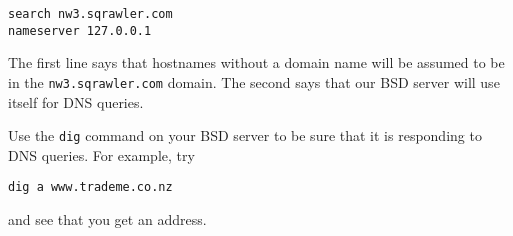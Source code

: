 \documentclass{article}
\begin{document}
\begin{verbatim}
search nw3.sqrawler.com
nameserver 127.0.0.1
\end{verbatim}

The first line says that hostnames without a domain name will be assumed to be in the \texttt{nw3.sqrawler.com} domain.  The second says that our BSD server will use itself for DNS queries.

Use the \texttt{dig} command on your BSD server to be sure that it is responding to DNS queries.  For example, try 

\texttt{dig a www.trademe.co.nz}

and see that you get an address. 
\end{document}

